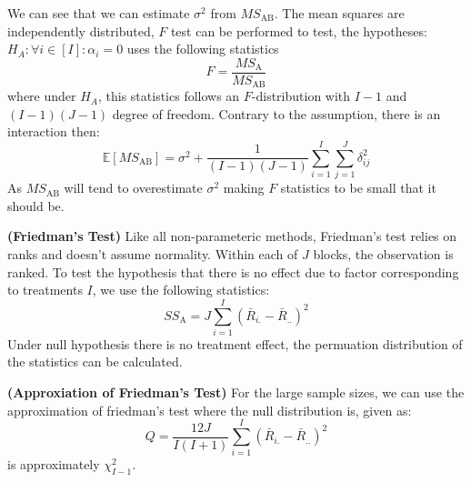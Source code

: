\begin{remark}
    We can see that we can estimate $\sigma^2$ from $MS_\text{AB}$. The mean squares are independently distributed, $F$ test can be performed to test, the hypotheses: $H_A : \forall i \in [I] : \alpha_i = 0$ uses the following statistics
    \begin{equation*}
        F = \frac{MS_\text{A}}{MS_\text{AB}}
    \end{equation*}
    where under $H_A$, this statistics follows an $F$-distribution with $I-1$ and $(I-1)(J-1)$ degree of freedom. Contrary to the assumption, there is an interaction then:
    \begin{equation*}
        \mathbb{E}[MS_\text{AB}] = \sigma^2 + \frac{1}{(I-1)(J-1)}\sum^I_{i=1}\sum^J_{j=1}\delta_{ij}^2
    \end{equation*}
    As $MS_\text{AB}$ will tend to overestimate $\sigma^2$ making $F$ statistics to be small that it should be. 
\end{remark}

\begin{definition}{\textbf{(Friedman's Test)}}
    Like all non-parameteric methods, Friedman's test relies on ranks and doesn't assume normality. Within each of $J$ blocks, the observation is ranked. To test the hypothesis that there is no effect due to factor corresponding to treatments $I$, we use the following statistics:    
    \begin{equation*}
        SS_\text{A} = J\sum^I_{i=1}(\bar{R}_{i.} - \bar{R}_{..})^2
    \end{equation*}
    Under null hypothesis there is no treatment effect, the permuation distribution of the statistics can be calculated. 
\end{definition}

\begin{definition}{\textbf{(Approxiation of Friedman's Test)}}
    For the large sample sizes, we can use the approximation of friedman's test where the null distribution is, given as:
    \begin{equation*}
        Q = \frac{12J}{I(I+1)}\sum^I_{i=1}(\bar{R}_{i.} - \bar{R}_{..})^2
    \end{equation*} 
    is approximately $\chi^2_{I-1}$.
\end{definition}

